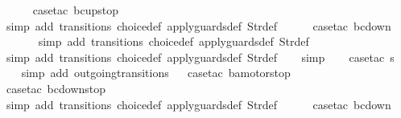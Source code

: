 \begin{isabellebody}
\ \ \ \ \isamarkupfalse%
\ {\isacharparenleft}case{\isacharunderscore}tac\ {\isachardoublequoteopen}bc{\isacharequal}up{}{}stop{\isachardoublequoteclose}{\isacharparenright}\isanewline
\ \ \ \ \ \isamarkupfalse%
\ {\isacharparenleft}simp\ add{\isacharcolon}\ transitions\ choice{\isacharunderscore}def\ apply{\isacharunderscore}guards{\isacharunderscore}def\ Str{\isacharunderscore}def{\isacharparenright}\isanewline
\ \ \ \ \isamarkupfalse%
\ {\isacharparenleft}case{\isacharunderscore}tac\ {\isachardoublequoteopen}bc{\isacharequal}down{}{}{\isachardoublequoteclose}{\isacharparenright}\isanewline
\ \ \ \ \ \isamarkupfalse%
\ {\isacharparenleft}simp\ add{\isacharcolon}\ transitions\ choice{\isacharunderscore}def\ apply{\isacharunderscore}guards{\isacharunderscore}def\ Str{\isacharunderscore}def{\isacharparenright}\isanewline
\ \ \ \ \isamarkupfalse%
\ {\isacharparenleft}simp\ add{\isacharcolon}\ transitions\ choice{\isacharunderscore}def\ apply{\isacharunderscore}guards{\isacharunderscore}def\ Str{\isacharunderscore}def{\isacharparenright}\isanewline
\ \ \isamarkupfalse%
\ simp\isanewline
\isanewline
\ \ \isamarkupfalse%
\ {\isacharparenleft}case{\isacharunderscore}tac\ {\isachardoublequoteopen}s{\isacharequal}{}{\isachardoublequoteclose}{\isacharparenright}\isanewline
\ \ \isamarkupfalse%
\ {\isacharparenleft}simp\ add{\isacharcolon}\ outgoing{\isacharunderscore}transitions{\isacharunderscore}{}{\isacharparenright}\isanewline
\ \isamarkupfalse%
\ {\isacharparenleft}case{\isacharunderscore}tac\ {\isachardoublequoteopen}ba{\isacharequal}motorstop{}{\isachardoublequoteclose}{\isacharparenright}\isanewline
\ \ \ \ \isamarkupfalse%
\ {\isacharparenleft}case{\isacharunderscore}tac\ {\isachardoublequoteopen}bc{\isacharequal}down{}{}stop{\isachardoublequoteclose}{\isacharparenright}\isanewline
\ \ \ \ \ \isamarkupfalse%
\ {\isacharparenleft}simp\ add{\isacharcolon}\ transitions\ choice{\isacharunderscore}def\ apply{\isacharunderscore}guards{\isacharunderscore}def\ Str{\isacharunderscore}def{\isacharparenright}\isanewline
\ \ \ \ \isamarkupfalse%
\ {\isacharparenleft}case{\isacharunderscore}tac\ {\isachardoublequoteopen}bc{\isacharequal}down{}{}{\isachardoublequoteclose}{\isacharparenright}\isanewline
\ \ \ \ \ \isamarkupfalse%

\end{isabellebody}
